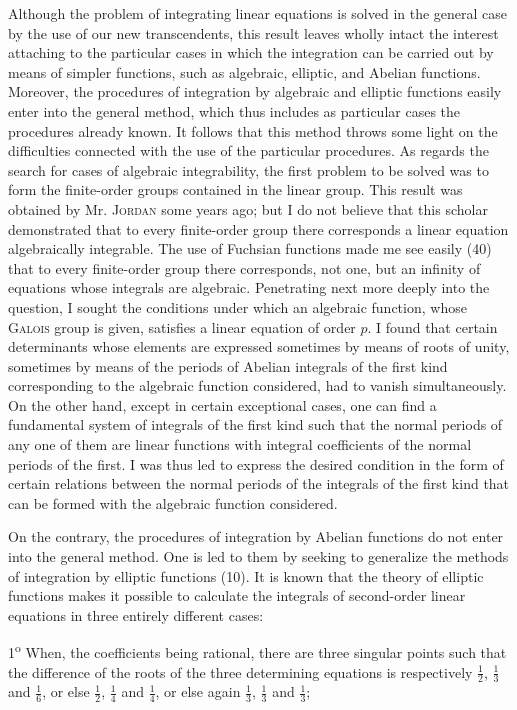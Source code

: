 \documentclass[11pt]{article}
\begin{document}
Although the problem of integrating linear equations is solved in the general case by the use of our new transcendents, this result leaves wholly intact the interest attaching to the particular cases in which the integration can be carried out by means of simpler functions, such as algebraic, elliptic, and Abelian functions. Moreover, the procedures of integration by algebraic and elliptic functions easily enter into the general method, which thus includes as particular cases the procedures already known. It follows that this method throws some light on the difficulties connected with the use of the particular procedures. As regards the search for cases of algebraic integrability, the first problem to be solved was to form the finite-order groups contained in the linear group. This result was obtained by Mr. \textsc{Jordan} some years ago; but I do not believe that this scholar demonstrated that to every finite-order group there corresponds a linear equation algebraically integrable. The use of Fuchsian functions made me see easily (40) that to every finite-order group there corresponds, not one, but an infinity of equations whose integrals are algebraic. Penetrating next more deeply into the question, I sought the conditions under which an algebraic function, whose \textsc{Galois} group is given, satisfies a linear equation of order $p$. I found that certain determinants whose elements are expressed sometimes by means of roots of unity, sometimes by means of the periods of Abelian integrals of the first kind corresponding to the algebraic function considered, had to vanish simultaneously. On the other hand, except in certain exceptional cases, one can find a fundamental system of integrals of the first kind such that the normal periods of any one of them are linear functions with integral coefficients of the normal periods of the first. I was thus led to express the desired condition in the form of certain relations between the normal periods of the integrals of the first kind that can be formed with the algebraic function considered.

On the contrary, the procedures of integration by Abelian functions do not enter into the general method. One is led to them by seeking to generalize the methods of integration by elliptic functions (10). It is known that the theory of elliptic functions makes it possible to calculate the integrals of second-order linear equations in three entirely different cases:

1\textsuperscript{o} When, the coefficients being rational, there are three singular points such that the difference of the roots of the three determining equations is respectively $\frac12$, $\frac13$ and $\frac16$, or else $\frac12$, $\frac14$ and $\frac14$, or else again $\frac13$, $\frac13$ and $\frac13$;
\end{document}
